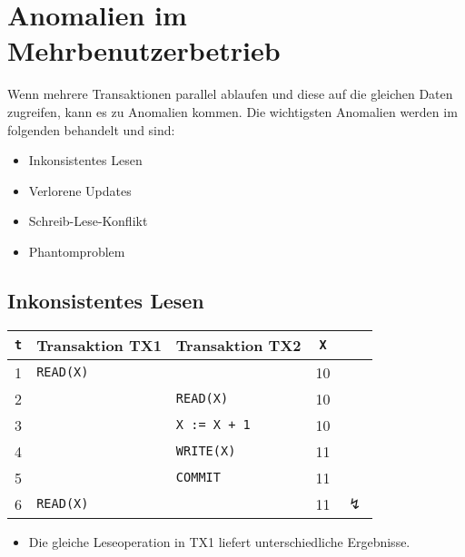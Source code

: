     \section{Anomalien im Mehrbenutzerbetrieb} %
    	Wenn mehrere Transaktionen parallel ablaufen und diese auf die gleichen Daten zugreifen, kann es zu Anomalien kommen. Die wichtigsten Anomalien werden im folgenden behandelt und sind:
    	\begin{itemize}
    		\item Inkonsistentes Lesen
    		\item Verlorene Updates
    		\item Schreib-Lese-Konflikt
    		\item Phantomproblem
    	\end{itemize}

        \subsection{Inkonsistentes Lesen} %
           	\begin{table}[H]
           		\centering
           		\begin{tabular}{c | l | l | c c}
           			\textbf{\texttt{t}} & \textbf{Transaktion TX1} & \textbf{Transaktion TX2} & \textbf{\texttt{X}} &                \\ \hline
           			         1          & \texttt{READ(X)}         &                          & 10                  &                \\
           			         2          &                          & \texttt{READ(X)}         & 10                  &                \\
           			         3          &                          & \texttt{X := X + 1}      & 10                  &                \\
           			         4          &                          & \texttt{WRITE(X)}        & 11                  &                \\
           			         5          &                          & \texttt{COMMIT}          & 11                  &                \\
           			         6          & \texttt{READ(X)}         &                          & 11                  & \(\lightning\)
           		\end{tabular}
           	\end{table}
        
         \begin{itemize}
            	\item Die gleiche Leseoperation in TX1 liefert unterschiedliche Ergebnisse.
         \end{itemize}

